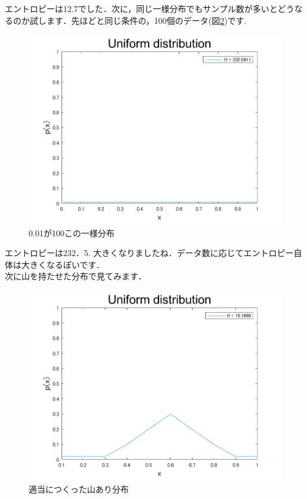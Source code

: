 \documentclass[11pt,a4paper]{jsarticle}                    %
\begin{document}
エントロピーは12.7でした．次に，同じ一様分布でもサンプル数が多いとどうなるのか試します．先ほどと同じ条件の，100個のデータ(図\ref{im:ent2})です.

\begin{figure}[H]
\label{im:ent2}
  \centering
  \includegraphics[width=200mm, bb=0 0 600 400]{../figures/dis_entropy2.png}
  \caption{0.01が100この一様分布}
\end{figure}

エントロピーは232．5. 大きくなりましたね．データ数に応じてエントロピー自体は大きくなるぽいです．\\
次に山を持たせた分布で見てみます．

\begin{figure}[H]
\label{im:ent2}
  \centering
  \includegraphics[width=200mm, bb=0 0 600 400]{../figures/dis_entropy3.png}
  \caption{適当につくった山あり分布}
\end{figure}
\end{document}
